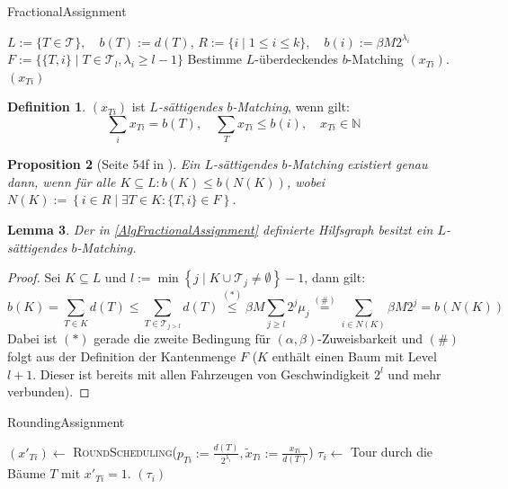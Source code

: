 \documentclass[a4paper,ngerman,12pt,bibtotoc]{scrartcl}
\theoremstyle{definition}
\newtheorem{defn}{Definition}[section]
\theoremstyle{plain}
\newtheorem{prop}[defn]{Proposition}
\newtheorem{lemma}[defn]{Lemma}
\theoremstyle{remark}
\newcommand{\NN}{\mathbb{N}}
\newcommand{\Tc}{\mathcal{T}}
\begin{document}
	\begin{algorithm}[H]
		\caption{FractionalAssignment}\label{AlgFractionalAssignment}
		\begin{algorithmic}[1]
			\Procedure{FractionalAssignment}{$\left(\Tc\right)$}
			\State $L := \{T \in \Tc\},\quad b(T) := d(T)$, \quad $R := \{i \mid 1\leq i \leq k\},\quad b(i) := \beta M 2^{\lambda_i}$
			\State $F := \{\{T,i\} \mid T \in \Tc_l, \lambda_i \geq l-1\}$ 
			\State Bestimme $L$-überdeckendes $b$-Matching $\left(x_{Ti}\right)$.
			\State \Return $\left(x_{Ti}\right)$
			\EndProcedure
		\end{algorithmic}
	\end{algorithm}
	
	\begin{defn}
		$(x_{Ti})$ ist \emph{$L$-sättigendes $b$-Matching}, wenn gilt:
			\[\sum_i x_{Ti} = b(T),\quad \sum_T x_{Ti} \leq b(i),\quad x_{Ti}\in\NN\]
	\end{defn}
	
	\begin{prop}[Seite 54f in \cite{bMatching}]
		Ein $L$-sättigendes $b$-Matching existiert genau dann, wenn für alle $K\subseteq L: b(K) \leq b(N(K))$, wobei $N(K) := \left\{i\in R \mid \exists T \in K: \{T,i\} \in F \right\}$.
	\end{prop}
	
	\begin{lemma}
		Der in \cref{AlgFractionalAssignment} definierte Hilfsgraph besitzt ein $L$-sättigendes $b$-Matching.
	\end{lemma}
	
	\begin{proof}
		Sei $K \subseteq L$ und $l := \min \left\{j \mid K\cup \Tc_j \neq \emptyset\right\}-1$, dann gilt:
			\[b(K) = \sum_{T\in K} d(T) \leq \sum_{T \in \Tc_{j> l}}d(T) \overset{(\ast)}{\leq} \beta M \sum_{j\geq l} 2^j\mu_j \overset{(\#)}{=} \sum_{i\in N(K)}\beta M 2^j = b(N(K))\]
		Dabei ist $(\ast)$ gerade die zweite Bedingung für $(\alpha, \beta)$-Zuweisbarkeit und $(\#)$ folgt aus der Definition der Kantenmenge $F$ ($K$ enthält einen Baum mit Level $l+1$. Dieser ist bereits mit allen Fahrzeugen von Geschwindigkeit $2^l$ und mehr verbunden). 
	\end{proof}
	
	\begin{algorithm}[H]
		\caption{RoundingAssignment}\label{AlgRoundingAssignment}
		\begin{algorithmic}[1]
			\State $\left(x'_{Ti}\right) \gets$ \textsc{RoundScheduling}($p_{Ti} := \frac{d(T)}{2^{\lambda_i}}, \tilde{x}_{Ti} := \frac{x_{Ti}}{d(T)}$)
			\State $\tau_i \gets$ Tour durch die Bäume $T$ mit $x'_{Ti} = 1$.
			\State \Return $\left(\tau_i\right)$
			\EndProcedure
		\end{algorithmic}
	\end{algorithm}
	
\end{document}
